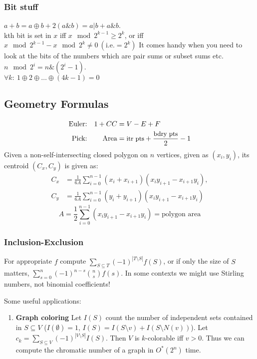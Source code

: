 \documentclass[
	a4paper,
	landscape,
	10pt,
]{article}
\begin{document}
\begin{multicols}{3}
		\subsubsection*{Bit stuff} $a + b = a \oplus b + 2(a\&b) = a | b + a\&b$. \\
		kth bit is set in $x$ iff $x \mod 2^{k-1} \geq 2^k$, or iff $x \mod 2^{k-1}  - x \mod 2^k \neq 0~(\text{i.e.} = 2^k)$ It comes handy when you need to look at the bits of the numbers which are pair sums or subset sums etc. \\
		$n \mod 2^i = n\&(2^i-1)$. \\
		$\forall k:~ 1 \oplus 2 \oplus \hdots \oplus (4k-1) = 0$


		\subsection{Geometry Formulas}
		\begin{align*}
			\textrm{Euler:}&&  1 + CC &= V - E + F\\
            \textrm{Pick:}&& \textrm{Area} &= {\small \textrm{itr pts}
            + \frac{\textrm{bdry pts}}2 - 1}
		\end{align*}
		Given a non-self-intersecting closed polygon on $n$ vertices, given as $(x_i, y_i)$, its centroid $(C_x, C_y)$ is given as:
		\begin{align*}
			C_x &= \frac{1}{6A} \sum_{i = 0}^{n - 1} (x_i + x_{i+1}) (x_i y_{i+1} - x_{i+1} y_i), \\
			C_y &= \frac{1}{6A} \sum_{i = 0}^{n - 1} (y_i + y_{i+1}) (x_i y_{i+1} - x_{i+1} y_i)
		\end{align*}
		\begin{equation*}
			A = \frac{1}{2} \sum_{i = 0}^{n - 1} (x_i y_{i+1} - x_{i+1} y_i) = \textrm{polygon area}
		\end{equation*}

		\subsubsection*{Inclusion-Exclusion}
		For appropriate $f$ compute $\sum_{S\subseteq T} (-1)^{|T\setminus S|} f(S)$,
		or if only the size of $S$ matters, $\sum_{s=0}^n (-1)^{n-s} \binom{n}{s}f(s)$.
		In some contexts we might use Stirling numbers, not binomial coefficients!

		Some useful applications:
		\begin{enumerate}
			\item[] \textbf{Graph coloring} Let $I(S)$ count the number
				of independent sets
				contained in $S \subseteq V$ ($I(\emptyset) = 1$,
				$I(S) = I(S\setminus v) + I(S\setminus N(v))$). Let
				$c_k = \sum_{S\subseteq V} (-1)^{|V\setminus S|} I(S)$. Then $V$
				is $k$-colorable iff $v > 0$. Thus we can compute the chromatic
				number of a graph in $O^*(2^n)$ time.
		\end{enumerate}


\end{multicols}
\end{document}
